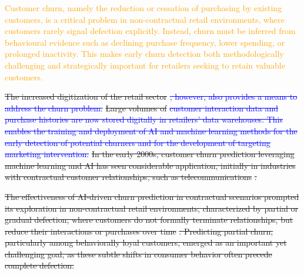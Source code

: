 \textcolor{orange}{Customer churn, namely the reduction or cessation of purchasing by existing customers, is a critical problem in non-contractual retail environments, where customers rarely signal defection explicitly. Instead, churn must be inferred from behavioural evidence such as declining purchase frequency, lower spending, or prolonged inactivity. This makes early churn detection both methodologically challenging and strategically important for retailers seeking to retain valuable customers.}

\sout{The increased digitization of the retail sector} \textcolor{blue}{\sout{, however, also provides a means to address the churn problem.}} \sout{Large volumes of} \textcolor{blue}{\sout{customer interaction data and purchase histories are now stored digitally in retailers' data warehouses. This enables the training and deployment of AI and machine learning methods for the early detection of potential churners and for the development of targeting marketing intervention.}}
\sout{In the early 2000s, customer churn prediction leveraging machine learning and AI has seen considerable application, initially in industries with contractual customer relationships, such as telecommunications} \cite{Predicting-subscriber-dissatisfaction-Mozer}\sout{.}

\sout{The effectiveness of AI-driven churn prediction in contractual scenarios prompted its exploration in non-contractual retail environments, characterized by partial or gradual defection, where customers do not formally terminate relationships, but reduce their interactions or purchases over time} \cite{S37-ID826-Buckinx}\sout{. Predicting partial churn, particularly among behaviorally loyal customers, emerged as an important yet challenging goal, as these subtle shifts in consumer behavior often precede complete defection.}

